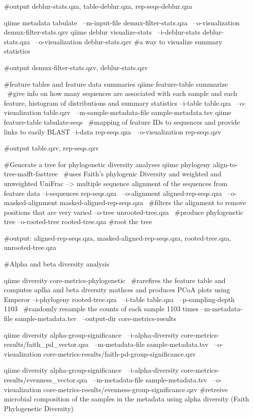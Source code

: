   #output deblur-stats.qza, table-deblur.qza, rep-seqs-deblur.qza
  
  qiime metadata tabulate \
  --m-input-file demux-filter-stats.qza \
  --o-visualization demux-filter-stats.qzv
qiime deblur visualize-stats \
  --i-deblur-stats deblur-stats.qza \
  --o-visualization deblur-stats.qzv #a way to visualize summary statistics 
  
  #output demux-filter-stats.qzv, deblur-stats.qzv
  
  
  #feature tables and feature data summaries
  qiime feature-table summarize \ #give info on how many sequences are associated with each sample and each feature, histogram of distributions and summary statistics
  --i-table table.qza \
  --o-visualization table.qzv \
  --m-sample-metadata-file sample-metadata.tsv
qiime feature-table tabulate-seqs \ #mapping of feature IDs to sequences and provide links to easily BLAST
  --i-data rep-seqs.qza \
  --o-visualization rep-seqs.qzv 
  
  #output table.qzv, rep-seqs.qzv
  
  #Generate a tree for phylogenetic diversity analyses
  qiime phylogeny align-to-tree-mafft-fasttree \ #uses Faith's phylogenic Diversity and weighted and unweighted UniFrac --> multiple sequence alignment of the sequences from feature data 
  --i-sequences rep-seqs.qza \
  --o-alignment aligned-rep-seqs.qza \
  --o-masked-alignment masked-aligned-rep-seqs.qza \ #filters the alignment to remove positions that are very varied
  --o-tree unrooted-tree.qza \ #produce phylogenetic tree
  --o-rooted-tree rooted-tree.qza #root the tree
  
  #output: aligned-rep-seqs.qza, masked-aligned-rep-seqs.qza, rooted-tree.qza, unrooted-tree.qza
  
  #Alpha and beta diversity analysis
  
 qiime diversity core-metrics-phylogenetic \ #rarefires the feature table and computes aplha and beta diversity mathces and produces PCoA plots using Emperor 
  --i-phylogeny rooted-tree.qza \
  --i-table table.qza \
  --p-sampling-depth 1103 \ #randomly resample the counts of each sample 1103 times
  --m-metadata-file sample-metadata.tsv \
  --output-dir core-metrics-results
  
  qiime diversity alpha-group-significance \
  --i-alpha-diversity core-metrics-results/faith_pd_vector.qza \
  --m-metadata-file sample-metadata.tsv \
  --o-visualization core-metrics-results/faith-pd-group-significance.qzv

qiime diversity alpha-group-significance \
  --i-alpha-diversity core-metrics-results/evenness_vector.qza \
  --m-metadata-file sample-metadata.tsv \
  --o-visualization core-metrics-results/evenness-group-significance.qzv #retreive microbial composition of the samples in the metadata using alpha diversity  (Faith Phylogenetic Diversity)
  
